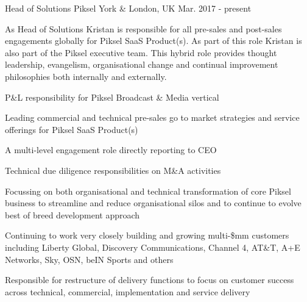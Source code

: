 


\begin{cventries}


\cvexpentry
{Head of Solutions} %
{Piksel} %
{York \& London, UK} %
{Mar. 2017 - present} %
{
\begin{cvitemstitle}
\item {As Head of Solutions Kristan is responsible for all pre-sales and post-sales engagements globally for Piksel SaaS Product(s). As part of this role Kristan is also part of the Piksel executive team. This hybrid role provides thought leadership, evangelism, organisational change and continual improvement philosophies both internally and externally.}
\end{cvitemstitle}
}
{ %
\begin{cvitems}
\item {P\&L responsibility for Piksel Broadcast \& Media vertical}
\item {Leading commercial and technical pre-sales go to market strategies and service offerings for Piksel SaaS Product(s)}
\item {A multi-level engagement role directly reporting to CEO}
\item {Technical due diligence responsibilities on M\&A activities}
\item {Focussing on both organisational and technical transformation of core Piksel business to streamline and reduce organisational silos and to continue to evolve best of breed development approach}
\item {Continuing to work very closely building and growing multi-\$mm customers including Liberty Global, Discovery Communications, Channel 4, AT\&T, A+E Networks, Sky, OSN, beIN Sports and others}
\item {Responsible for restructure of delivery functions to focus on customer success across technical, commercial, implementation and service delivery}
\end{cvitems}
}


\end{cventries}
